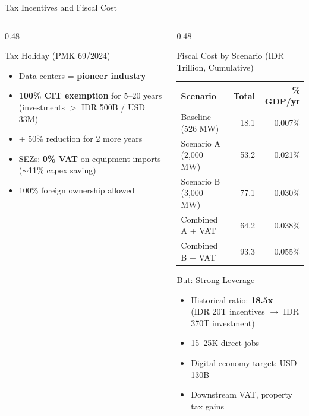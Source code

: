 \documentclass[aspectratio=169,11pt]{beamer}
\begin{document}
\begin{frame}{Tax Incentives and Fiscal Cost}

\begin{columns}[T]
\begin{column}{0.48\textwidth}
\begin{block}{Tax Holiday (PMK 69/2024)}
\small
\begin{itemize}
    \item Data centers = \textbf{pioneer industry}
    \item \textbf{100\% CIT exemption} for 5--20 years\\ (investments $>$ IDR 500B / USD 33M)
    \item + 50\% reduction for 2 more years
    \item SEZs: \textbf{0\% VAT} on equipment imports ($\sim$11\% capex saving)
    \item 100\% foreign ownership allowed
\end{itemize}
\end{block}

\end{column}

\begin{column}{0.48\textwidth}
\begin{block}{Fiscal Cost by Scenario (IDR Trillion, Cumulative)}
\small
\begin{tabular}{p{3.6cm}rr}
\toprule
\textbf{Scenario} & \textbf{Total} & \textbf{\% GDP/yr} \\
\midrule
Baseline (526 MW)        & 18.1  & 0.007\% \\
Scenario A (2,000 MW)    & 53.2  & 0.021\% \\
Scenario B (3,000 MW)    & 77.1  & 0.030\% \\
Combined A + VAT         & 64.2  & 0.038\% \\
Combined B + VAT         & 93.3  & 0.055\% \\
\bottomrule
\end{tabular}
\end{block}

\begin{block}{But: Strong Leverage}
\small
\begin{itemize}
    \item Historical ratio: \textbf{18.5x}\\ (IDR 20T incentives $\to$ IDR 370T investment)
    \item 15--25K direct jobs
    \item Digital economy target: USD 130B
    \item Downstream VAT, property tax gains
\end{itemize}
\end{block}
\end{column}
\end{columns}

\end{frame}
\end{document}
